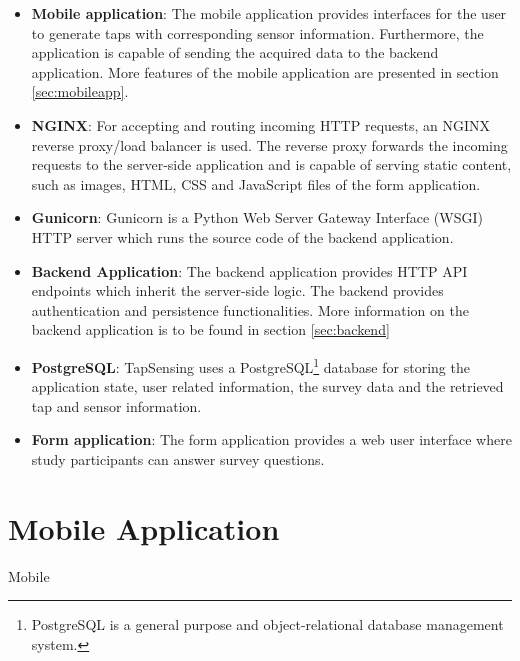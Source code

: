 \begin{itemize}
  \item \textbf{Mobile application}: The mobile application provides interfaces for the user to generate taps with corresponding sensor information. Furthermore, the application is capable of sending the acquired data to the backend application. More features of the mobile application are presented in section \ref{sec:mobileapp}. %
  \item \textbf{NGINX}: For accepting and routing incoming HTTP requests, an NGINX reverse proxy/load balancer is used. The reverse proxy forwards the incoming requests to the server-side application and is capable of serving static content, such as images, HTML, CSS and JavaScript files of the form application.
  \item \textbf{Gunicorn}: Gunicorn is a Python Web Server Gateway Interface (WSGI) HTTP server which runs the source code of the backend application.
  \item \textbf{Backend Application}: The backend application provides HTTP API endpoints which inherit the server-side logic. The backend provides authentication and persistence functionalities. More information on the backend application is to be found in section \ref{sec:backend}
  \item \textbf{PostgreSQL}: TapSensing uses a PostgreSQL\footnote{PostgreSQL is a general purpose and object-relational database management system.} database for storing the application state, user related information, the survey data and the retrieved tap and sensor information.
  \item \textbf{Form application}: The form application provides a web user interface where study participants can answer survey questions.
\end{itemize}


\section{Mobile Application}
Mobile
\label{sec:mobileapp}

